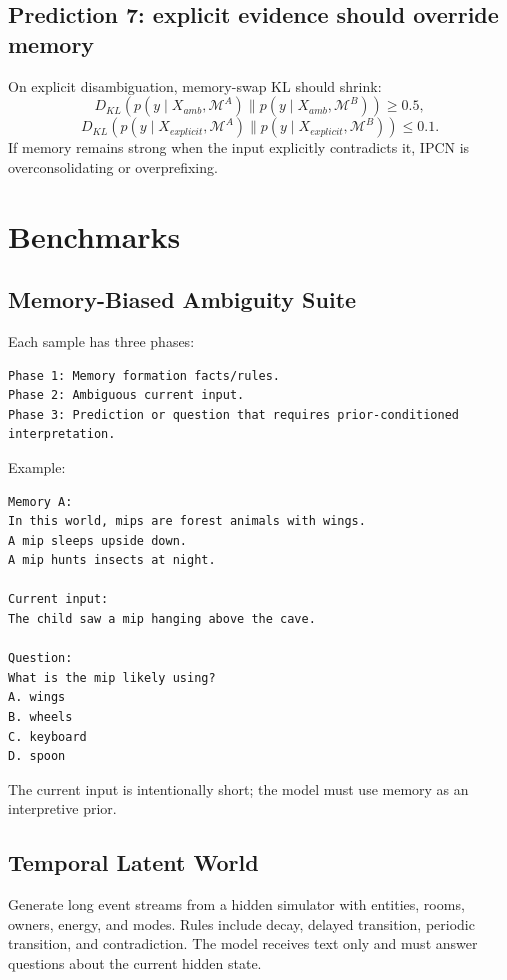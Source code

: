 \documentclass[11pt]{article}
\newcommand{\Mem}{\mathcal{M}}
\begin{document}
\subsection{Prediction 7: explicit evidence should override memory}

On explicit disambiguation, memory-swap KL should shrink:
\begin{equation}
    D_{KL}(p(y\mid X_{amb},\Mem^A)\|p(y\mid X_{amb},\Mem^B))\ge 0.5,
\end{equation}
\begin{equation}
    D_{KL}(p(y\mid X_{explicit},\Mem^A)\|p(y\mid X_{explicit},\Mem^B))\le 0.1.
\end{equation}
If memory remains strong when the input explicitly contradicts it, IPCN is overconsolidating or overprefixing.

\section{Benchmarks}

\subsection{Memory-Biased Ambiguity Suite}

Each sample has three phases:
\begin{lstlisting}
Phase 1: Memory formation facts/rules.
Phase 2: Ambiguous current input.
Phase 3: Prediction or question that requires prior-conditioned interpretation.
\end{lstlisting}
Example:
\begin{lstlisting}
Memory A:
In this world, mips are forest animals with wings.
A mip sleeps upside down.
A mip hunts insects at night.

Current input:
The child saw a mip hanging above the cave.

Question:
What is the mip likely using?
A. wings
B. wheels
C. keyboard
D. spoon
\end{lstlisting}
The current input is intentionally short; the model must use memory as an interpretive prior.

\subsection{Temporal Latent World}

Generate long event streams from a hidden simulator with entities, rooms, owners, energy, and modes. Rules include decay, delayed transition, periodic transition, and contradiction. The model receives text only and must answer questions about the current hidden state.
\end{document}
